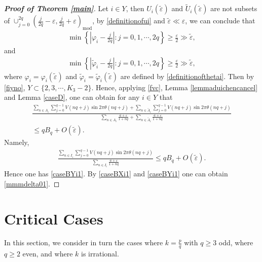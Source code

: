 \documentclass[12pt]{amsart}
\newcommand{\abs}[1]{\left\lvert #1 \right\rvert}
\theoremstyle{plain}
\theoremstyle{definition}
\begin{document}
\begin{proof}[\textbf{Proof of Theorem \ref{main}}]
	
Let $i\in Y$, then $U_i(\tilde{\varepsilon})$ and $\tilde{U}_i(\tilde{\varepsilon})$ are not subsets of  $\cup_{j=0}^{2q} \left(\frac{j}{2q}-\varepsilon,\frac{j}{2q}+\varepsilon\right)_{\mathrm{mod}}$, by \eqref{definitionofui} and $\tilde{\varepsilon}\ll \varepsilon$,
we can conclude that
\begin{align}
\min\left\{\abs{\varphi_i-\frac{j}{2q}}:j=0,1,\cdots,2q\right\}\geq \frac{\varepsilon}{2}\gg\tilde{\varepsilon},\nonumber
\end{align}
and
\begin{align}
\min\left\{\abs{\tilde{\varphi}_i-\frac{j}{2q}}:j=0,1,\cdots,2q\right\}\geq \frac{\varepsilon}{2}\gg\tilde{\varepsilon},\nonumber
\end{align}
where $\varphi_i=\varphi_i(\tilde{\varepsilon})$ and $\tilde{\varphi}_i=\tilde{\varphi}_i(\tilde{\varepsilon})$ are defined by \eqref{definitionofthetai}. Then by \eqref{fiyno}, $Y\subset\{2,3,\cdots,K_3-2\}$.
Hence, applying \eqref{fvc}, Lemma  \ref{lemmaduichencancel} and  Lemma \ref{caseD}, one can obtain for any $i\in Y$ that
\begin{align}
\frac{\sum_{n\in A_i}\sum_{j=0}^{q-1}V(nq+j)\sin2\pi\theta(nq+j)+\sum_{n\in \tilde{A}_i}\sum_{j=0}^{q-1}V(nq+j)\sin2\pi\theta(nq+j)}{\sum_{n\in A_i}\frac{a+\varepsilon}{1+nq}+\sum_{n\in \tilde{A}_i}\frac{a+\varepsilon}{1+nq}}\nonumber\\
\leq qB_q+O(\tilde{\varepsilon}).\nonumber
\end{align}
Namely,
\begin{align}
\frac{\sum_{n\in I_i}\sum_{j=0}^{q-1}V(nq+j)\sin2\pi\theta(nq+j)}{\sum_{n\in I_i}\frac{a+\varepsilon}{1+nq}}\leq qB_q+O(\tilde{\varepsilon}).\nonumber
\end{align}
Hence one has \eqref{caseBYi1}.
By \eqref{caseBXi1} and \eqref{caseBYi1} one can obtain \eqref{mmmdelta01}.
\end{proof}
	

		\section{Critical Cases}\label{sec9}
	In this section,  we consider in turn the cases where $k=\frac{p}{q}$ with $q\geq 3$ odd, where $q\geq 2$ even, and where $k$ is irrational.
\end{document}
